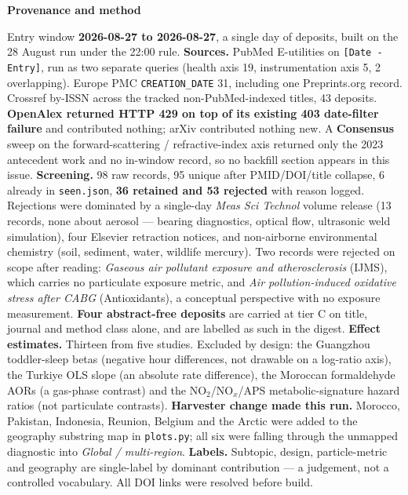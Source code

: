 \documentclass[10pt]{article}
\begin{document}


\vspace{4mm}
\begin{keybox}
{\sffamily\bfseries\footnotesize\color{Deep}Provenance and method}\\[1.2mm]
{\fontsize{7.2}{8.8}\selectfont
Entry window \textbf{2026-08-27 to 2026-08-27}, a single day of deposits, built on the
28 August run under the 22:00 rule.
\textbf{Sources.} PubMed E-utilities on \texttt{[Date - Entry]}, run as two separate
queries (health axis 19, instrumentation axis 5, 2 overlapping). Europe PMC
\texttt{CREATION\_DATE} 31, including one Preprints.org record. Crossref by-ISSN across
the tracked non-PubMed-indexed titles, 43 deposits. \textbf{OpenAlex returned HTTP 429
on top of its existing 403 date-filter failure} and contributed nothing; arXiv
contributed nothing new. A \textbf{Consensus} sweep on the forward-scattering /
refractive-index axis returned only the 2023 antecedent work and no in-window record, so
no backfill section appears in this issue.
\textbf{Screening.} 98 raw records, 95 unique after PMID/DOI/title collapse, 6 already in
\texttt{seen.json}, \textbf{36 retained and 53 rejected} with reason logged. Rejections
were dominated by a single-day \textit{Meas Sci Technol} volume release (13 records, none
about aerosol --- bearing diagnostics, optical flow, ultrasonic weld simulation), four
Elsevier retraction notices, and non-airborne environmental chemistry (soil, sediment,
water, wildlife mercury). Two records were rejected on scope after reading:
\textit{Gaseous air pollutant exposure and atherosclerosis} (IJMS), which carries no
particulate exposure metric, and \textit{Air pollution-induced oxidative stress after
CABG} (Antioxidants), a conceptual perspective with no exposure measurement.
\textbf{Four abstract-free deposits} are carried at tier C on title, journal and method
class alone, and are labelled as such in the digest.
\textbf{Effect estimates.} Thirteen from five studies. Excluded by design: the Guangzhou
toddler-sleep betas (negative hour differences, not drawable on a log-ratio axis), the
Turkiye OLS slope (an absolute rate difference), the Moroccan formaldehyde AORs (a
gas-phase contrast) and the NO$_2$/NO$_x$/APS metabolic-signature hazard ratios (not
particulate contrasts).
\textbf{Harvester change made this run.} Morocco, Pakistan, Indonesia, Reunion, Belgium
and the Arctic were added to the geography substring map in \texttt{plots.py}; all six
were falling through the unmapped diagnostic into \textit{Global / multi-region}.
\textbf{Labels.} Subtopic, design, particle-metric and geography are single-label by
dominant contribution --- a judgement, not a controlled vocabulary. All DOI links were
resolved before build.\par}
\end{keybox}
\end{document}
